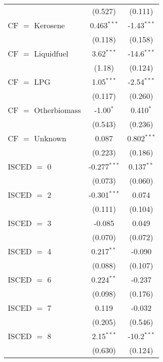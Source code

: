 \begin{table}[htbp!]
\begin{adjustbox}{width = 1\textwidth, max height = 0.95\textheight, center}
\begin{threeparttable}[b]
\begin{tabular}{lcc}
                                  & (0.527)        & (0.111)\\   
            CF $=$ Kerosene       & 0.463$^{***}$  & -1.43$^{***}$\\   
                                  & (0.118)        & (0.158)\\   
            CF $=$ Liquidfuel     & 3.62$^{***}$   & -14.6$^{***}$\\   
                                  & (1.18)         & (0.124)\\   
            CF $=$ LPG            & 1.05$^{***}$   & -2.54$^{***}$\\   
                                  & (0.117)        & (0.260)\\   
            CF $=$ Otherbiomass   & -1.00$^{*}$    & 0.410$^{*}$\\   
                                  & (0.543)        & (0.236)\\   
            CF $=$ Unknown        & 0.087          & 0.802$^{***}$\\   
                                  & (0.223)        & (0.186)\\   
            ISCED $=$ 0           & -0.277$^{***}$ & 0.137$^{**}$\\   
                                  & (0.073)        & (0.060)\\   
            ISCED $=$ 2           & -0.301$^{***}$ & 0.074\\   
                                  & (0.111)        & (0.104)\\   
            ISCED $=$ 3           & -0.085         & 0.049\\   
                                  & (0.070)        & (0.072)\\   
            ISCED $=$ 4           & 0.217$^{**}$   & -0.090\\   
                                  & (0.088)        & (0.107)\\   
            ISCED $=$ 6           & 0.224$^{**}$   & -0.237\\   
                                  & (0.098)        & (0.176)\\   
            ISCED $=$ 7           & 0.119          & -0.032\\   
                                  & (0.205)        & (0.546)\\   
            ISCED $=$ 8           & 2.15$^{***}$   & -10.2$^{***}$\\   
                                  & (0.630)        & (0.124)\\   

\end{tabular}
\end{threeparttable}
\end{adjustbox}
\end{table}
